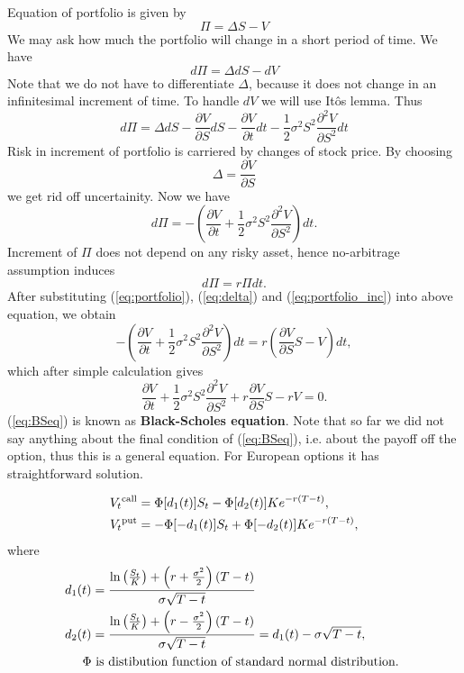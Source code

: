 \documentclass[a4paper,12pt, oneside]{book}
\theoremstyle{definition}
\theoremstyle{remark}
\begin{document}
Equation of portfolio is given by
\begin{equation}
 \label{eq:portfolio}
  \Pi = \Delta S - V 
\end{equation}
We may ask how much the portfolio will change in a short period of time. We have
\[ d\Pi = \Delta dS - dV  \]
Note that we do not have to differentiate $\Delta$, because it does not change in an infinitesimal increment of time. To handle $dV$ we will use It\^{o}s lemma. Thus
\[ d\Pi = \Delta dS - \frac{\partial V}{\partial S}dS - \frac{\partial V}{\partial t}dt - \frac{1}{2}\sigma^2 S^2 \frac{\partial^2 V}{\partial S^2}dt  \]
Risk in increment of portfolio is carriered by changes of stock price. By choosing
\begin{equation}
 \label{eq:delta}
 \Delta = \frac{\partial V}{\partial S}
\end{equation}
we get rid off uncertainity. Now we have
\begin{equation}
  \label{eq:portfolio_inc}
 d\Pi = -(\frac{\partial V}{\partial t} + \frac{1}{2}\sigma^2 S^2 \frac{\partial^2 V}{\partial S^2})dt.
\end{equation}
Increment of $\Pi$ does not depend on any risky asset, hence no-arbitrage assumption induces
\[ d\Pi = r\Pi dt. \]
After substituting (\ref{eq:portfolio}), (\ref{eq:delta}) and (\ref{eq:portfolio_inc}) into above equation, we obtain
\[ -(\frac{\partial V}{\partial t} + \frac{1}{2}\sigma^2 S^2 \frac{\partial^2 V}{\partial S^2})dt = r(\frac{\partial V}{\partial S} S - V)dt, \]
which after simple calculation gives
\begin{equation}
 \label{eq:BSeq}
 \frac{\partial V}{\partial t} + \frac{1}{2}\sigma^2 S^2 \frac{\partial^2 V}{\partial S^2} + r\frac{\partial V}{\partial S} S - rV = 0.
\end{equation}
(\ref{eq:BSeq}) is known as \textbf{Black-Scholes equation}. Note that so far we did not say anything about the final condition of (\ref{eq:BSeq}), i.e. about the payoff off the option, thus this is a general equation. For European options it has straightforward solution.

\begin{align*}
V_t\textsuperscript{call} &= \Phi[d_1(t)]S_t  - \Phi[d_2(t)]K e^{-r(T-t)},\\
V_t\textsuperscript{put} &= -\Phi[-d_1(t)]S_t + \Phi[-d_2(t)]K e^{-r(T-t)},
\end{align*}
where
\begin{align*}
d_1(t) &= \frac{\ln\left(\frac{S_t}{K}\right)+\left(r+\frac{\sigma^{2}}{2}\right)(T-t)}{\sigma\sqrt{T-t}}\\
d_2(t) &= \frac{\ln\left(\frac{S_t}{K}\right)+\left(r-\frac{\sigma^{2}}{2}\right)(T-t)}{\sigma\sqrt{T-t}} = d_{1}(t)-\sigma\sqrt{T-t},\\
\Phi & \hbox{ is distibution function of standard normal distribution. } 
\end{align*}
\end{document}
